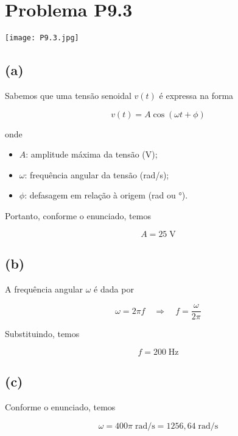 
\section*{Problema P9.3}

\renewcommand*\thesection{9.3}

\begin{center}
    \texttt{[image: P9.3.jpg]}
\end{center}

\subsection*{(a)}

Sabemos que uma tensão senoidal $v(t)$ é expressa na forma


\begin{equation}\label{eq:9.3.1}
    v(t) = A\cos\left(\omega t + \phi\right)
\end{equation}

onde

\begin{itemize}
    \item $A$: amplitude máxima da tensão (V);
    \item $\omega$: frequência angular da tensão (rad/s);
    \item $\phi$: defasagem em relação à origem (rad ou °).
\end{itemize}

Portanto, conforme o enunciado, temos

\[ \boxed{A = 25 \; \textrm{V}}  \]

\subsection*{(b)}

A frequência angular $\omega$ é dada por

\[ \omega = 2\pi f \quad \Rightarrow \quad f = \frac{\omega}{2\pi} \]

Substituindo, temos

\[ \boxed{f = 200 \; \textrm{Hz}}  \]

\subsection*{(c)}

Conforme o enunciado, temos

\[ \boxed{\omega = 400\pi \; \textrm{rad/s} = 1256,64 \; \textrm{rad/s}}  \]

